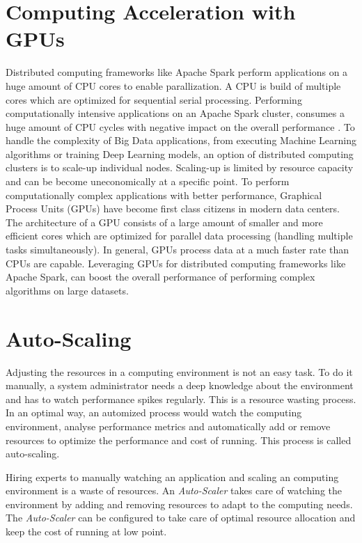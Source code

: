 \section{Computing Acceleration with GPUs}
Distributed computing frameworks like Apache Spark perform applications on a huge amount of CPU cores to enable parallization. A CPU is build of multiple cores which are optimized for sequential serial processing. Performing computationally intensive applications on an Apache Spark cluster, consumes a huge amount of CPU cycles with negative impact on the overall performance \cite{Li2015HeteroSpark}.
To handle the complexity of Big Data applications, from executing Machine Learning algorithms or training Deep Learning models, an option of distributed computing clusters is to scale-up individual nodes. Scaling-up is limited by resource capacity and can be become uneconomically at a specific point.
To perform computationally complex applications with better performance, Graphical Process Units (GPUs) have become first class citizens in modern data centers. The architecture of a GPU consists of a large amount of smaller and more efficient cores which are optimized for parallel data processing (handling multiple tasks simultaneously). In general, GPUs process data at a much faster rate than CPUs are capable.
Leveraging GPUs for distributed computing frameworks like Apache Spark, can boost the overall performance of performing complex algorithms on large datasets.


\section{Auto-Scaling}
Adjusting the resources in a computing environment is not an easy task. To do it manually, a system administrator needs a deep knowledge about the environment and has to watch performance spikes regularly. This is a resource wasting process. In an optimal way, an automized process would watch the computing environment, analyse performance metrics and automatically add or remove resources to optimize the performance and cost of running. This process is called auto-scaling.


Hiring experts to manually watching an application and scaling an computing environment is a waste of resources.
An \textit{Auto-Scaler} takes care of watching the environment by adding and removing resources to adapt to the computing needs. The \textit{Auto-Scaler} can be configured to take care of optimal resource allocation and keep the cost of running at low point.


